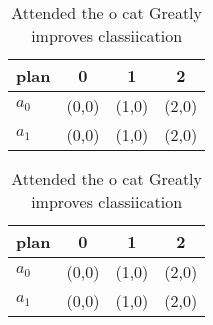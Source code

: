 \documentclass[a4paper]{article}
\begin{document}
\begin{table}
\begin{adjustbox}{width=0.6\columnwidth}
\begin{tabular}{|l|l|l|l|}
\hline
\textbf{plan} & \multicolumn{1}{c|}{\textbf{0}} & \multicolumn{1}{c|}{\textbf{1}} & \multicolumn{1}{c|}{\textbf{2}} \\ \hline
\textbf{$a_0$}  & (0,0) & (1,0) & (2,0) \\ \hline
\textbf{$a_1$}  & (0,0) & (1,0) & (2,0) \\ \hline
\end{tabular}
\end{adjustbox}
\caption{Attended the o cat Greatly improves classiication
}
\end{table}

\begin{table}
\begin{adjustbox}{width=0.6\columnwidth}
\begin{tabular}{|l|l|l|l|}
\hline
\textbf{plan} & \multicolumn{1}{c|}{\textbf{0}} & \multicolumn{1}{c|}{\textbf{1}} & \multicolumn{1}{c|}{\textbf{2}} \\ \hline
\textbf{$a_0$}  & (0,0) & (1,0) & (2,0) \\ \hline
\textbf{$a_1$}  & (0,0) & (1,0) & (2,0) \\ \hline
\end{tabular}
\end{adjustbox}
\caption{Attended the o cat Greatly improves classiication
}
\end{table}
\end{document}
